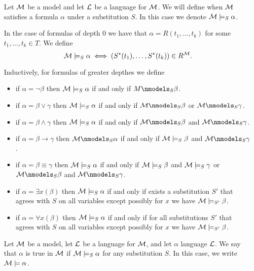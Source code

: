 \documentclass[11pt,a4paper]{article}
\renewcommand{\implies}{\rightarrow}
\begin{document}
  \begin{definition}
    Let $\mathcal{M}$ be a model and let $\mathcal{L}$ be a language for $\mathcal{M}$.
    We will define when $\mathcal{M}$ satisfies a formula $\alpha$ under a
    substitution $S$. In this case we denote $\mathcal{M} \models_S \alpha$.

    In the case of formulas of depth $0$ we have that 
    $\alpha = R(t_1,\dots,t_k)$ for some $t_1,\dots,t_k \in T$.
    We define
    \[
      \mathcal{M} \models_S \alpha \iff (S^*(t_1),\dots,S^*(t_k)) \in R^{\mathcal{M}}.
    \]

    Inductively, for formulas of greater depthes we define
    \begin{itemize}
      \item if $\alpha = \neg \beta$ then $\mathcal{M} \models_S \alpha$ if and only
        if $M \nmodels_S \beta$.
      \item if $\alpha = \beta \lor \gamma$ then $\mathcal{M} \models_S \alpha$ if and 
        only if $\M \nmodels_S \beta$ or $\M \nmodels_S \gamma$.
      \item if $\alpha = \beta \land \gamma$ then $\mathcal{M} \models_S \alpha$ if and 
        only if $\M \nmodels_S \beta$ and $\M \nmodels_S \gamma$.
      \item if $\alpha = \beta \implies \gamma$ then $\M \nmodels_S \alpha$ 
        if and only if $\mathcal{M} \models_S \beta$ and $\M \nmodels_S \gamma$.
      \item if $\alpha = \beta \equiv \gamma$ then $\mathcal{M} \models_S \alpha$ 
        if and only if $\mathcal{M} \models_S \beta$ and $\mathcal{M} \models_S \gamma$ or
        $\M \nmodels_S \beta$ and $\M \nmodels_S \gamma$.
      \item if $\alpha = \exists x(\beta)$ then $\mathcal{M} \models_S \alpha$ if
        and only if exists a substitution $S'$ that agrees with $S$ on all
        variables except possibly for $x$ we have $\mathcal{M} \models_{S'} \beta$.
      \item if $\alpha = \forall x(\beta)$ then $\mathcal{M} \models_S \alpha$ if
        and only if for all substitutions $S'$ that agrees with $S$ on all
        variables except possibly for $x$ we have $\mathcal{M} \models_{S'} \beta$.
    \end{itemize}
  \end{definition}

  \begin{definition}
    Let $\mathcal{M}$ be a model, let $\mathcal{L}$ be a language for $\mathcal{M}$, 
    and let $\alpha$ language $\mathcal{L}$.
    We say that $\alpha$ is true in $\mathcal{M}$ if $\mathcal{M} \models_S \alpha$ for any
    substitution $S$.
    In this case, we write $\mathcal{M} \models \alpha$.
  \end{definition}
\end{document}

